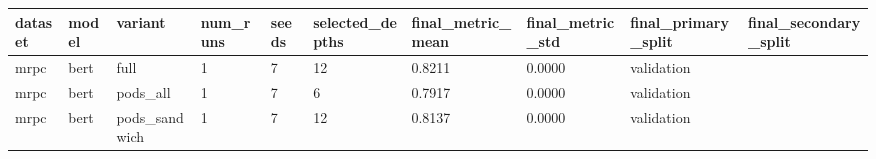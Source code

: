 \begin{tabular}{llllllllll}
\hline
dataset & model & variant & num\_runs & seeds & selected\_depths & final\_metric\_mean & final\_metric\_std & final\_primary\_split & final\_secondary\_split \\
\hline
mrpc & bert & full & 1 & 7 & 12 & 0.8211 & 0.0000 & validation &  \\
mrpc & bert & pods\_all & 1 & 7 & 6 & 0.7917 & 0.0000 & validation &  \\
mrpc & bert & pods\_sandwich & 1 & 7 & 12 & 0.8137 & 0.0000 & validation &  \\
\hline
\end{tabular}
